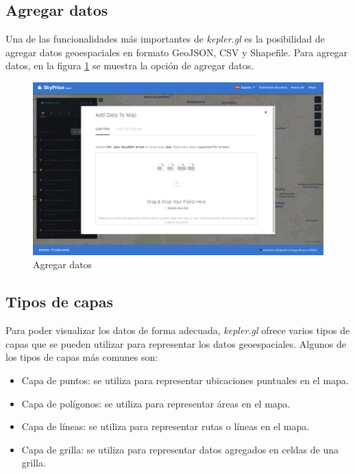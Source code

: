 \subsection{Agregar datos}
Una de las funcionalidades más importantes de \textit{kepler.gl} es la posibilidad
de agregar datos geoespaciales en formato GeoJSON, CSV y Shapefile. Para agregar
datos, en la figura \ref{fig:avanzado-agregar} se muestra la opción de agregar datos.

\begin{figure}[H]
    \centering
    \includegraphics[width=1.0\textwidth]{imagenes/05-mapa-interactivo/avanzado-agregar.png}
    \caption{Agregar datos}
    \label{fig:avanzado-agregar}
\end{figure}

\subsection{Tipos de capas}
Para poder visualizar los datos de forma adecuada, \textit{kepler.gl} ofrece
varios tipos de capas que se pueden utilizar para representar los datos
geoespaciales. Algunos de los tipos de capas más comunes son:

\begin{itemize}
    \item Capa de puntos: se utiliza para representar ubicaciones puntuales en
    el mapa.
    \item Capa de polígonos: se utiliza para representar áreas en el mapa.
    \item Capa de líneas: se utiliza para representar rutas o líneas en el mapa.
    \item Capa de grilla: se utiliza para representar datos agregados en celdas
    de una grilla.
\end{itemize}

